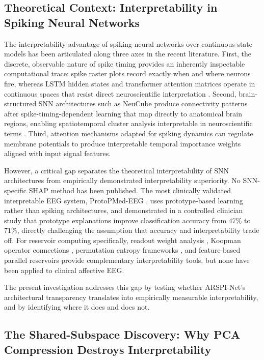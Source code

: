 \subsection{Theoretical Context: Interpretability in Spiking Neural Networks}
\label{sec:interp_theory}

The interpretability advantage of spiking neural networks over continuous-state models has been articulated along three axes in the recent literature. First, the discrete, observable nature of spike timing provides an inherently inspectable computational trace: spike raster plots record exactly when and where neurons fire, whereas LSTM hidden states and transformer attention matrices operate in continuous spaces that resist direct neuroscientific interpretation \cite{kim_sam_2021}. Second, brain-structured SNN architectures such as NeuCube \cite{kasabov_neucube_2014} produce connectivity patterns after spike-timing-dependent learning that map directly to anatomical brain regions, enabling spatiotemporal cluster analysis interpretable in neuroscientific terms \cite{doborjeh_explainable_2021}. Third, attention mechanisms adapted for spiking dynamics \cite{yao_attention_snn_2023} can regulate membrane potentials to produce interpretable temporal importance weights aligned with input signal features.

However, a critical gap separates the theoretical interpretability of SNN architectures from empirically demonstrated interpretability superiority. No SNN-specific SHAP method has been published. The most clinically validated interpretable EEG system, ProtoPMed-EEG \cite{barnett_protopmed_2024}, uses prototype-based learning rather than spiking architectures, and demonstrated in a controlled clinician study that prototype explanations improve classification accuracy from $47\%$ to $71\%$, directly challenging the assumption that accuracy and interpretability trade off. For reservoir computing specifically, readout weight analysis \cite{alao_discovering_2021}, Koopman operator connections \cite{gulina_koopman_2021}, permutation entropy frameworks \cite{reservoir_pe_2022}, and feature-based parallel reservoirs \cite{goswami_feature_esn_2024} provide complementary interpretability tools, but none have been applied to clinical affective EEG.

The present investigation addresses this gap by testing whether ARSPI-Net's architectural transparency translates into empirically measurable interpretability, and by identifying where it does and does not.

\subsection{The Shared-Subspace Discovery: Why PCA Compression Destroys Interpretability}
\label{sec:shared_subspace}

